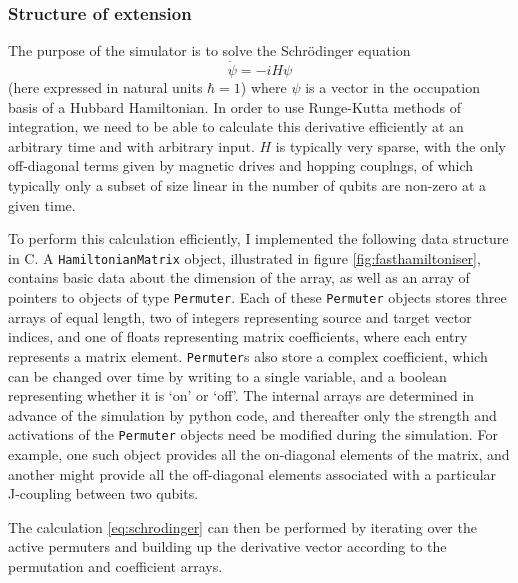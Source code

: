 \documentclass{report}
\begin{document}
\subsubsection{Structure of extension}
The purpose of the simulator is to solve the Schrödinger equation
\begin{equation} \label{eq:schrodinger}
    \dot{\psi} = -i H \psi 
\end{equation} (here expressed in natural units $\hbar = 1$) where $\psi$ is a vector in the occupation basis of a Hubbard Hamiltonian. In order to use Runge-Kutta \cite{Butcher1996} methods of integration, we need to be able to calculate this derivative efficiently at an arbitrary time and with arbitrary input. $H$ is typically very sparse, with the only off-diagonal terms given by magnetic drives and hopping couplngs, of which typically only a subset of size linear in the number of qubits are non-zero at a given time. 

To perform this calculation efficiently, I implemented the following data structure in C. A \texttt{HamiltonianMatrix} object, illustrated in figure \ref{fig:fasthamiltoniser}, contains basic data about the dimension of the array, as well as an array of pointers to objects of type \texttt{Permuter}. Each of these \texttt{Permuter} objects stores three arrays of equal length, two of integers representing source and target vector indices, and one of floats representing matrix coefficients, where each entry represents a matrix element. \texttt{Permuter}s also store a complex coefficient, which can be changed over time by writing to a single variable, and a boolean representing whether it is `on' or `off'. The internal arrays are determined in advance of the simulation by python code, and thereafter only the strength and activations of the \texttt{Permuter} objects need be modified during the simulation. For example, one such object provides all the on-diagonal elements of the matrix, and another might provide all the off-diagonal elements associated with a particular J-coupling between two qubits.

The calculation \ref{eq:schrodinger} can then be performed by iterating over the active permuters and building up the derivative vector according to the permutation and coefficient arrays. 
\end{document}
